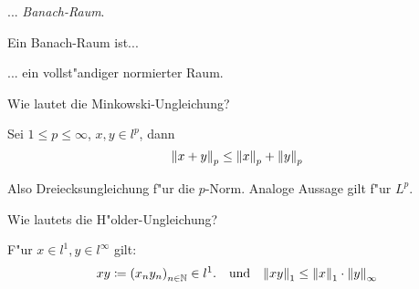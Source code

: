 \documentclass[9pt]{article}
\newenvironment{field}{}{\newpage}
\newif\ifnote
\newenvironment{note}{\notetrue}{\notefalse}
\begin{document}
\begin{note}
	\begin{field}  %
	... \textit{Banach-Raum}.	
	\end{field}
		
	\begin{field}  %
		Ein Banach-Raum ist...
	\end{field}
	
	\begin{field}  %
		... ein vollst"andiger normierter Raum.
	\end{field}
	
		
	\begin{field}  %
		Wie lautet die Minkowski-Ungleichung?
	\end{field}
	
	\begin{field}  %
		Sei $1\leq p \leq \infty$, $x,y \in l^p$, dann
		\begin{equation*}
			\norm{x + y}_p \leq \norm{x}_p + \norm{y}_p
		\end{equation*}
	
	Also Dreiecksungleichung f"ur die $p$-Norm.
	Analoge Aussage gilt f"ur $L^p$.
	\end{field}
		
	\begin{field}  %
		Wie lautets die H"older-Ungleichung?
	\end{field}
	
	\begin{field}  %
		F"ur $x\in l^1, y \in l^\infty$ gilt:
		\begin{equation*}
			xy \coloneqq \qty(x_n y_n)_{n\in \mathbb{N}} \in l^1. \qq{und} \norm{xy}_1 \leq \norm{x}_1 \cdot\norm{y}_\infty
		\end{equation*}
	\end{field}
\end{note}
\end{document}
